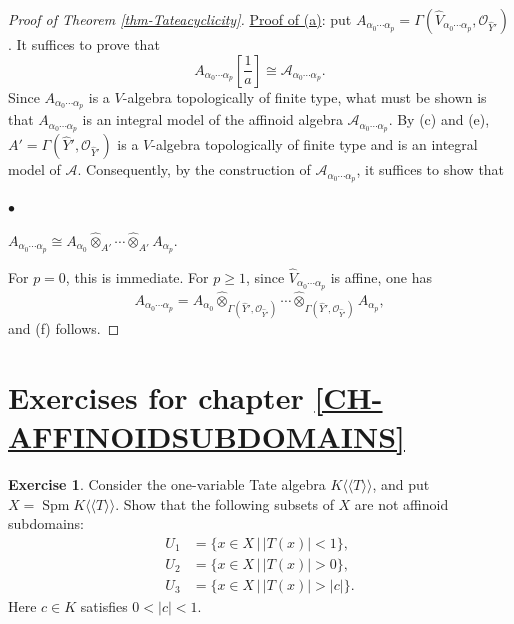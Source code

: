 \documentclass[a4paper,12pt, dvipdfmx]{jsbook}
\def\O{\mathscr{O}}
\def\Spm{\mathop{\mathrm{Spm}}\nolimits}
\def\dl{\langle\!\langle}
\def\dr{\rangle\!\rangle}
\newcommand{\abs}[1]{\lvert#1\rvert}
\renewenvironment{itemize}%
{%
   \begin{list}{\parbox{1zw}{$\bullet$}}%
   {%
      \setlength{\topsep}{.5zh}
      \setlength{\itemindent}{0zw}
      \setlength{\leftmargin}{3zw}%
      \setlength{\rightmargin}{0zw}%
      \setlength{\labelsep}{.5zw}%
      \setlength{\labelwidth}{3zw}%
      \setlength{\itemsep}{0.2em}%
      \setlength{\parsep}{0em}%
      \setlength{\listparindent}{0zw}%
   }
}{%
   \end{list}%
}
\theoremstyle{plain}
\theoremstyle{definition}
\newtheorem{exer}{\bfseries Exercise}[chapter]
\begin{document}
\begin{proof}[{{\rm Proof of Theorem \ref{thm-Tateacyclicity}}}]
\medskip\noindent
\underline{Proof of (a)}: put $A_{\alpha_0\cdots\alpha_p}=\Gamma(\widehat{V}_{\alpha_0\cdots\alpha_p},\O_{\widehat{Y}'})$.
It suffices to prove that
$$
{\textstyle A_{\alpha_0\cdots\alpha_p}[\frac{1}{a}]\cong\mathcal{A}_{\alpha_0\cdots\alpha_p}}.
$$
Since $A_{\alpha_0\cdots\alpha_p}$ is a $V$-algebra topologically of finite type, what must be shown is that $A_{\alpha_0\cdots\alpha_p}$ is an integral model of the affinoid algebra $\mathcal{A}_{\alpha_0\cdots\alpha_p}$.
By (c) and (e), $A'=\Gamma(\widehat{Y}',\O_{\widehat{Y}'})$ is a $V$-algebra topologically of finite type and is an integral model of $\mathcal{A}$.
Consequently, by the construction of $\mathcal{A}_{\alpha_0\cdots\alpha_p}$, it suffices to show that
\begin{itemize}
\item[(f)] $A_{\alpha_0\cdots\alpha_p}\cong A_{\alpha_0}\widehat{\otimes}_{A'}\cdots\widehat{\otimes}_{A'}A_{\alpha_p}$.
\end{itemize}
For $p=0$, this is immediate.
For $p\geq 1$, since $\widehat{V}_{\alpha_0\cdots\alpha_p}$ is affine, one has
$$
A_{\alpha_0\cdots\alpha_p}=A_{\alpha_0}\widehat{\otimes}_{\Gamma(\widehat{Y}',\O_{\widehat{Y}'})}\cdots\widehat{\otimes}_{\Gamma(\widehat{Y}',\O_{\widehat{Y}'})}A_{\alpha_p},
$$
and (f) follows.
\end{proof}

\section*{Exercises for chapter \ref{CH-AFFINOIDSUBDOMAINS}}
\begin{exer}\label{exer-notaffinoidsubdomains}{\rm 
Consider the one-variable Tate algebra $K\dl T\dr$, and put $X=\Spm K\dl T\dr$.
Show that the following subsets of $X$ are not affinoid subdomains:
\begin{equation*}
\begin{split}
U_1&=\{x\in X\,|\,\abs{T(x)}<1\},\\
U_2&=\{x\in X\,|\,\abs{T(x)}>0\},\\
U_3&=\{x\in X\,|\,\abs{T(x)}>\abs{c}\}.
\end{split}
\end{equation*}
Here $c\in K$ satisfies $0<\abs{c}<1$.}
\end{exer}
\end{document}
